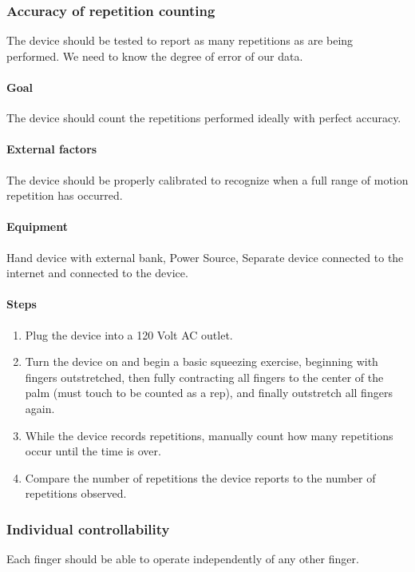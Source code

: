 \documentclass{article}
\begin{document}
\subsubsection{Accuracy of repetition counting}
The device should be tested to report as many repetitions as are being performed. We need to know the degree of error of our data.

\paragraph{Goal} The device should count the repetitions performed ideally with perfect accuracy.

\paragraph{External factors} The device should be properly calibrated to recognize when a full range of motion repetition has occurred.

\paragraph{Equipment} Hand device with external bank, Power Source, Separate device connected to the internet and connected to the device.

\paragraph{Steps}
\begin{enumerate}
\item Plug the device into a 120 Volt AC outlet.
\item Turn the device on and begin a basic squeezing exercise, beginning with fingers outstretched, then fully contracting all fingers to the center of the palm (must touch to be counted as a rep), and finally outstretch all fingers again.
\item While the device records repetitions, manually count how many repetitions occur until the time is over.
\item Compare the number of repetitions the device reports to the number of repetitions observed.
\end{enumerate}

\subsubsection{Individual controllability}
Each finger should be able to operate independently of any other finger.
\end{document}
